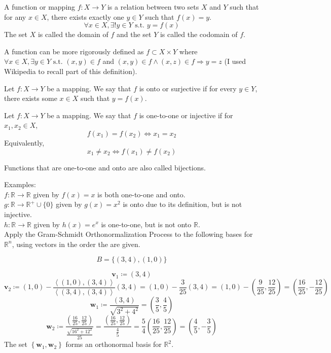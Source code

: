\documentclass[12pt, letterpaper]{report}
\begin{document}
\begin{definition}[Function]
    A function or mapping \(f:X\to Y\) is a relation between two sets \(X\) and \(Y\) such that for any \(x\in X\), there exists exactly one \(y\in Y\) such that \(f(x)=y\). 
    \[
        \forall x\in X, \exists! y\in Y \text{ s.t. }y=f(x) 
    \]
    The set \(X\) is called the domain of \(f\) and the set \(Y\) is called the codomain of \(f\).
\end{definition}
A function can be more rigorously defined as \(f \subset X\times Y\) where \(\forall x\in X, \exists y\in Y\text{ s.t. }(x,y)\in f \) and \((x,y)\in f \land (x,z)\in f \Longrightarrow y=z\) (I used Wikipedia to recall part of this definition).
\begin{definition}[Onto]
    Let \(f:X\to Y\) be a mapping. We say that \(f\) is onto or surjective if for every \(y\in Y\), there exists some \(x\in X\) such that \(y=f(x)\).
\end{definition}
\begin{definition}
    Let \(f:X\to Y\) be a mapping. We say that \(f\) is one-to-one or injective if for \(x_1,x_2\in X\),
    \[f \left( x_1 \right) = f \left( x_2 \right) \iff  x_1 = x_2\]
    Equivalently,
    \[
        x_1 \neq x_2 \iff f \left( x_1 \right) \neq f \left( x_2 \right) 
    \]
\end{definition}
\begin{remark}
    Functions that are one-to-one and onto are also called bijections.
\end{remark}
Examples:\\
\(f:\mathbb{R}\to \mathbb{R} \) given by \(f(x)=x\) is both one-to-one and onto. \\
\(g:\mathbb{R} \to \mathbb{R}^+ \cup \{ 0 \} \) given by \(g(x)=x^2\) is onto due to its definition, but is not injective.\\
\(h:\mathbb{R} \to \mathbb{R} \) given by \(h(x)=e^x\) is one-to-one, but is not onto \(\mathbb{R} \).\\
\newpage
Apply the Gram-Schmidt Orthonormalization Process to the following bases for \(\mathbb{R} ^n\), using vectors in the order the are given. 
\begin{exercise}
    \[
        B=\{ (3,4),(1,0) \} 
    \]
\end{exercise}
\begin{solution}
    \[
        \mathbf{v}_1 \coloneqq (3,4)
    \]
    \[
        \mathbf{v}_2 \coloneqq (1,0) - \frac{\left\langle (1,0),(3,4) \right\rangle }{\left\langle (3,4) ,(3,4)\right\rangle }(3,4)=(1,0)-\frac{3}{25}(3,4)=(1,0)-\left( \frac{9}{25},\frac{12}{25} \right)= \left( \frac{16}{25},-\frac{12}{25} \right)
    \]
    \[
        \mathbf{w}_1 \coloneqq \frac{(3,4)}{\sqrt{3^2 + 4^2} }= \left( \frac{3}{5},\frac{4}{5} \right)
    \]
    \[
        \mathbf{w}_2 \coloneqq \frac{\left( \frac{16}{25},\frac{12}{25} \right)}{\frac{\sqrt{16^2 +12^2} }{25} }= \frac{\left( \frac{16}{25},\frac{12}{25} \right)}{\frac{4}{5}}=\frac{5}{4}\left( \frac{16}{25},\frac{12}{25} \right)= \left( \frac{4}{5},-\frac{3}{5} \right)
    \]
    The set \(\left\{ \mathbf{w} _1,\mathbf{w} _2 \right\} \) forms an orthonormal basis for \(\mathbb{R}^2\).
\end{solution}
\end{document}
